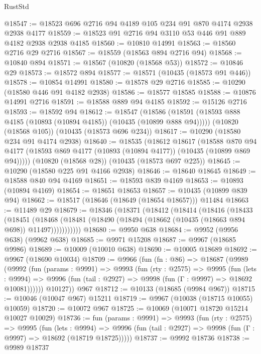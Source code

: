\begin{lexlean}{RustStd}
\begin{coremodule}
@18547 := @18523 @696 @2716 @94 @4189 @105 @234 @91 @870 @4174 @2938 @2938 @4177
@18559 := @18523 @91 @2716 @94 @3110 @53 @446 @91 @889 @4182 @2938 @2938 @4185
@18560 := @10810 @14991
@18563 := @18560 @2716 @29 @2716
@18567 := @18559 (@18563 @894 @2716 @94)
@18568 := @10840 @894
@18571 := @18567 (@10820 (@18568 @53))
@18572 := @10846 @29
@18573 := @18572 @894
@18577 := @18571 (@10435 (@18573 @91 @446))
@18578 := @10854 @14991
@18580 := @18578 @29 @2716
@18585 := @10290 (@18580 @446 @91 @4182 @2938)
@18586 := @18577 @18585
@18588 := @10876 @14991 @2716
@18591 := @18588 @889 @94 @4185
@18592 := @15126 @2716
@18593 := @18592 @94
@18612 := @18547
    (@18586 (@18591 (@18593 @888 @4185 (@10893 (@10894 @4185)) (@10435 (@10899 @888 @94)))))
    (@10820 (@18568 @105))
    (@10435 (@18573 @696 @234))
@18617 := @10290 (@18580 @234 @91 @4174 @2938)
@18640 := @18535
    (@18612
      @18617
      (@18588
        @870
        @94
        @4177
        (@18593 @869 @4177 (@10893 (@10894 @4177)) (@10435 (@10899 @869 @94)))))
    (@10820 (@18568 @28))
    (@10435 (@18573 @697 @225))
@18645 := @10290 (@18580 @225 @91 @4166 @2938)
@18646 := @18640 @18645
@18649 := @18588 @840 @94 @4169
@18651 := @18593 @839 @4169
@18653 := @10893 (@10894 @4169)
@18654 := @18651 @18653
@18657 := @10435 (@10899 @839 @94)
@18662 := @18517 (@18646 (@18649 (@18654 @18657))) @11484
@18663 := @11489 @29
@18679 := @18346
    (@18371
      (@18412
        (@18414
          (@18416
            (@18433
              (@18451
                (@18468
                  (@18481 (@18490 (@18494 (@18662 (@10435 (@18663 @894 @698)) @11497)))))))))))
@18680 := @9950 @638
@18684 := @9952 (@9956 @638) (@9962 @638)
@18685 := @9971 @15208
@18687 := @9967 (@18685 @9986)
@18689 := @10009 (@10010 @638)
@18690 := @10005 @18689
@18692 := @9967 (@18690 @10034)
@18709 := @9966
    (fun (fn : @86) =>
    @18687
      (@9989
        (@9992
          (fun (params : @9991) =>
          @9993
            (fun (rty : @2575) =>
            @9995
              (fun (lets : @9994) =>
              @9996 (fun (tail : @2927) => @9998 (fun (Γ : @9997) => @18692 @10081))))))
        @10127))
    @967
@18712 := @10133 (@18685 (@9984 @967))
@18715 := @10046 (@10047 @967) @15211
@18719 := @9967 (@10038 (@18715 @10055) @10059)
@18720 := @10072 @967
@18725 := @10069 (@10071 @18720 @15214 @10027 @10029)
@18736 := fun (params : @9991) =>
  @9993
    (fun (rty : @2575) =>
    @9995
      (fun (lets : @9994) =>
      @9996 (fun (tail : @2927) => @9998 (fun (Γ : @9997) => @18692 (@18719 @18725)))))
@18737 := @9992 @18736
@18738 := @9989 @18737

\end{coremodule}
\end{lexlean}
